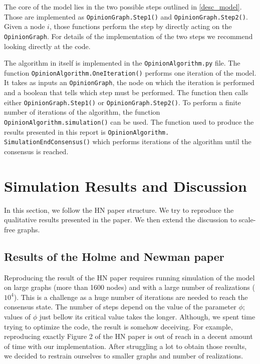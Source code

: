 \documentclass[11pt]{article}
\begin{document}
The core of the model lies in the two possible steps outlined in \autoref{desc_model}. Those are implemented as \texttt{OpinionGraph.Step1()} and \texttt{OpinionGraph.Step2()}. Given a node $i$, those functions perform the step by directly acting on the \texttt{OpinionGraph}. For details of the implementation of the two steps we recommend looking directly at the code.

The algorithm in itself is implemented in the \texttt{OpinionAlgorithm.py} file. The function \texttt{OpinionAlgorithm.OneIteration()} performs one iteration of the model. It takes as inputs an \texttt{OpinionGraph}, the node on which the iteration is performed and a boolean that tells which step must be performed. The function then calls either \texttt{OpinionGraph.Step1()} or \texttt{OpinionGraph.Step2()}. To perform a finite number of iterations of the algorithm, the function \texttt{OpinionAlgorithm.simulation()} can be used. The function used to produce the results presented in this report is \texttt{OpinionAlgorithm. SimulationEndConsensus()} which performs iterations of the algorithm until the consensus is reached.

\section{Simulation Results and Discussion}
\label{sim_results}
In this section, we follow the HN paper structure. We try to reproduce the qualitative results presented in the paper. We then extend the discussion to scale-free graphs.

\subsection{Results of the Holme and Newman paper}
Reproducing the result of the HN paper requires running simulation of the model on large graphs (more than 1600 nodes) and with a large number of realizations ($10^4$). This is a challenge as a huge number of iterations are needed to reach the consensus state. The number of steps depend on the value of the parameter $\phi$; values of $\phi$ just bellow its critical value takes the longer. Although, we spent time trying to optimize the code, the result is somehow deceiving.  For example, reproducing exactly Figure 2 of the HN paper is out of reach in a decent amount of time with our implementation. After struggling a lot to obtain those results, we decided to restrain ourselves to smaller graphs and number of realizations. 
\end{document}
